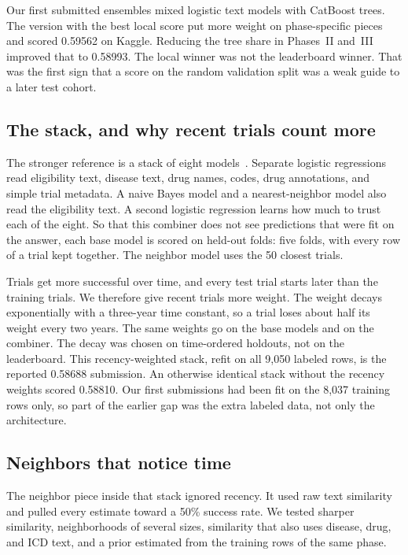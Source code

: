 Our first submitted ensembles mixed logistic text models with CatBoost trees.
The version with the best local score put more weight on phase-specific
pieces and scored 0.59562 on Kaggle. Reducing the tree share in Phases~II
and~III improved that to 0.58993. The local winner was not the leaderboard
winner. That was the first sign that a score on the random validation split
was a weak guide to a later test cohort.

\subsection{The stack, and why recent trials count more}

The stronger reference is a stack of eight models~\cite{wolpert1992stacked,pedregosa2011scikit}.
Separate logistic regressions read eligibility text, disease text, drug names,
codes, drug annotations, and simple trial metadata. A naive Bayes model and a
nearest-neighbor model also read the eligibility text. A second logistic
regression learns how much to trust each of the eight. So that this combiner
does not see predictions that were fit on the answer, each base model is
scored on held-out folds: five folds, with every row of a trial kept together.
The neighbor model uses the 50 closest trials.

Trials get more successful over time, and every test trial starts later than
the training trials. We therefore give recent trials more weight. The weight
decays exponentially with a three-year time constant, so a trial loses about
half its weight every two years. The same weights go on the base models and
on the combiner. The decay was chosen on time-ordered holdouts, not on the
leaderboard. This recency-weighted stack, refit on all 9,050 labeled rows,
is the reported 0.58688 submission. An otherwise identical stack without the
recency weights scored 0.58810. Our first submissions had been fit on the
8,037 training rows only, so part of the earlier gap was the extra labeled
data, not only the architecture.

\subsection{Neighbors that notice time}

The neighbor piece inside that stack ignored recency. It used raw text
similarity and pulled every estimate toward a 50\% success rate. We tested
sharper similarity, neighborhoods of several sizes, similarity that also uses
disease, drug, and ICD text, and a prior estimated from the training rows of
the same phase.

